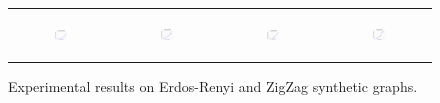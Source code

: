 \begin{figure}[ht]
\begin{tabular}{cccc}
	  \begin{subfigure}[b]{0.22\textwidth}
	  	\includegraphics[width=105pt]{images/validated_CC2G_bigsynthetic_maxgraphcut.pdf}
			\caption{}
			\label{appfig:validated_CC2G_bigsynthetic_maxgraphcut}
	  \end{subfigure} &
	  \begin{subfigure}[b]{0.22\textwidth}
	  	\includegraphics[width=105pt]{images/validated_CC2G_bigsynthetic_setcover.pdf}
			\caption{}
			\label{appfig:validated_CC2G_bigsynthetic_setcover}
	  \end{subfigure} &
	  \begin{subfigure}[b]{0.22\textwidth}
	  	\includegraphics[width=105pt]{images/validated_CC2G_zigzag_maxgraphcut.pdf}
			\caption{}
			\label{appfig:validated_CC2G_zigzag_maxgraphcut}
	  \end{subfigure} &
	  \begin{subfigure}[b]{0.22\textwidth}
	  	\includegraphics[width=105pt]{images/validated_CC2G_zigzag_setcover.pdf}
			\caption{}
			\label{appfig:validated_CC2G_zigzag_setcover}
	  \end{subfigure} \\
  \end{tabular}
  \caption{Experimental results on Erdos-Renyi and ZigZag synthetic graphs.}
\end{figure}


